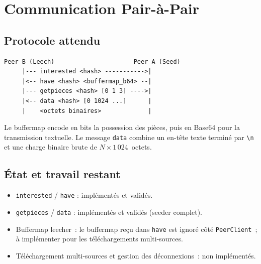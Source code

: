 \documentclass[11pt, a4paper]{article}
\begin{document}
\newpage
\section{Communication Pair-à-Pair}

\subsection{Protocole attendu}
 
\begin{center}
\begin{tcolorbox}[colback=lightgray, colframe=bordergray, width=0.82\textwidth]
\begin{lstlisting}[language={}]
Peer B (Leech)                      Peer A (Seed)
     |--- interested <hash> ----------->|
     |<-- have <hash> <buffermap_b64> --|
     |--- getpieces <hash> [0 1 3] ---->|
     |<-- data <hash> [0 1024 ...]      |
     |    <octets binaires>             |
\end{lstlisting}
\end{tcolorbox}
\end{center}
 
Le buffermap encode en bits la possession des pièces, puis en Base64
pour la transmission textuelle.
Le message \texttt{data} combine un en-tête texte terminé par
\texttt{\textbackslash n} et une charge binaire brute de
$N \times 1\,024$~octets.
 
\subsection{État et travail restant}
 
\begin{itemize}[nosep]
    \item \texttt{interested} / \texttt{have} : implémentés et validés.
    \item \texttt{getpieces} / \texttt{data} : implémentés et validés (seeder complet).
    \item Buffermap leecher~: le buffermap reçu dans \texttt{have} est ignoré côté
          \texttt{PeerClient}~; à implémenter pour les téléchargements multi-sources.
    \item Téléchargement multi-sources et gestion des déconnexions~: non implémentés.
\end{itemize}
 
\end{document}
